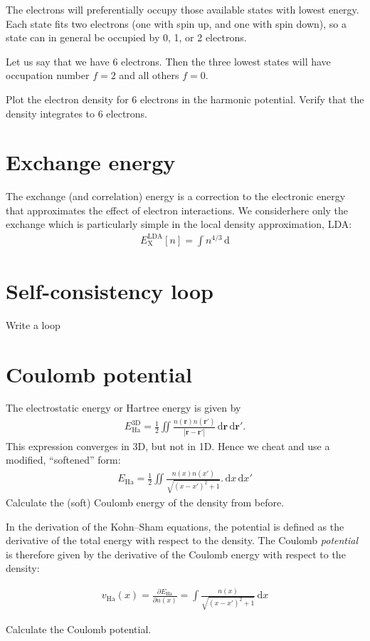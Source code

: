 \documentclass{article}
\newcommand{\dee}[0]{\mathrm d}
\newcommand{\idee}[0]{\,\dee}
\newcommand{\pdiff}[2]{\frac{\partial #1}{\partial #2}}
\newcommand{\X}[0]{\mathrm{X}}
\newcommand{\LDA}[0]{\mathrm{LDA}}
\begin{document}
The electrons will
preferentially occupy those available states with lowest energy.  Each
state fits two electrons (one with spin up, and one with spin down), so
a state can in general be occupied by 0, 1, or 2 electrons.

Let us say that we have 6 electrons.  Then the three lowest states
will have occupation number $f=2$ and all others $f=0$.

Plot the electron density for 6 electrons in the harmonic potential.
Verify that the density integrates to 6 electrons.

\section{Exchange energy}
The exchange (and correlation) energy is a correction to the
electronic energy that approximates the effect of electron interactions.
We considerhere only the exchange which is particularly simple in
the local density approximation, LDA:
\begin{align}
  E_\X^\LDA[n] = \int n^{4/3} \idee
\end{align}


\section{Self-consistency loop}
Write a loop

\section{Coulomb potential}
The electrostatic energy or Hartree energy is given by
\begin{align}
  E_{\mathrm{Ha}}^{\mathrm{3D}} = \frac12 \iint \frac{n(\mathbf r)n(\mathbf r')}{|\mathbf r - \mathbf r'|}\idee \mathbf r \idee \mathbf r'.
\end{align}
This expression converges in 3D, but not in 1D.  Hence we cheat and use
a modified, ``softened'' form:
\begin{align}
E_{\mathrm{Ha}} = \frac12 \iint \frac{n(x) n(x')}{\sqrt{(x - x')^2 + 1}}.
\idee x \idee x'
\end{align}
Calculate the (soft) Coulomb energy of the density from before.

In the derivation of the Kohn--Sham equations, the potential is defined
as the derivative of the total energy with respect to the density.
The Coulomb \emph{potential} is therefore given by the derivative
of the Coulomb energy with respect to the density:

\begin{align}
  v_{\mathrm{Ha}}(x) = \pdiff{E_{\mathrm{Ha}}}{n(x)} =
  \int \frac{n(x)}{\sqrt{(x - x')^2 + 1}} \idee x
\end{align}

Calculate the Coulomb potential.
\end{document}
